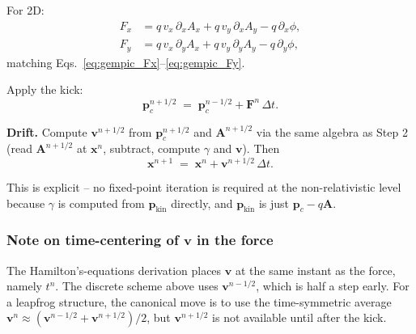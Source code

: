 \documentclass[11pt,a4paper]{article}
\newcommand{\vv}[1]{\mathbf{#1}}
\begin{document}
\begin{algsteps}
    For 2D:
    \begin{align}
    F_x &= q\,v_x\,\partial_x A_x + q\,v_y\,\partial_x A_y - q\,\partial_x\phi,\\
    F_y &= q\,v_x\,\partial_y A_x + q\,v_y\,\partial_y A_y - q\,\partial_y\phi,
    \end{align}
    matching Eqs.~\eqref{eq:gempic_Fx}--\eqref{eq:gempic_Fy}.

    Apply the kick:
    \begin{equation}
    \label{eq:gempic_kick}
    \vv{p}_c^{n+1/2} \;=\; \vv{p}_c^{n-1/2} + \vv{F}^n\,\Delta t.
    \end{equation}
  \item \textbf{Drift.}
    Compute $\vv{v}^{n+1/2}$ from $\vv{p}_c^{n+1/2}$ and
    $\vv{A}^{n+1/2}$ via the same algebra as Step 2 (read
    $\vv{A}^{n+1/2}$ at $\vv{x}^n$, subtract, compute $\gamma$
    and $\vv{v}$).  Then
    \begin{equation}
    \label{eq:gempic_drift}
    \vv{x}^{n+1} \;=\; \vv{x}^n + \vv{v}^{n+1/2}\,\Delta t.
    \end{equation}
\end{algsteps}

This is explicit -- no fixed-point iteration is required at the
non-relativistic level because $\gamma$ is computed from
$\vv{p}_{\mathrm{kin}}$ directly, and $\vv{p}_{\mathrm{kin}}$ is
just $\vv{p}_c - q\vv{A}$.

\subsubsection*{Note on time-centering of $\vv{v}$ in the force}

The Hamilton's-equations derivation places $\vv{v}$ at the same
instant as the force, namely $t^n$.  The discrete scheme above uses
$\vv{v}^{n-1/2}$, which is half a step early.  For a leapfrog
structure, the canonical move is to use the time-symmetric average
$\vv{v}^n \approx (\vv{v}^{n-1/2} + \vv{v}^{n+1/2})/2$, but
$\vv{v}^{n+1/2}$ is not available until after the kick.
\end{document}

